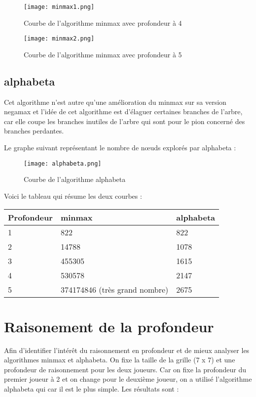 \documentclass[11pt, pdflatex]{report}
\begin{document}
\begin{figure}[H]
    \centering
    \texttt{[image: minmax1.png]}
    \caption{Courbe de l'algorithme minmax avec profondeur à 4}
\end{figure}

\begin{figure}[H]
    \centering
    \texttt{[image: minmax2.png]}
    \caption{Courbe de l'algorithme minmax avec profondeur à 5}
\end{figure}

\newpage
\subsection{alphabeta}
Cet algorithme n’est autre qu’une amélioration du minmax sur sa version negamax et l’idée de cet algorithme est d’élaguer certaines branches de l’arbre, car elle coupe les branches inutiles de l’arbre qui sont pour le pion concerné des branches perdantes.\par
Le graphe suivant représentant le nombre de nœuds explorés par alphabeta :\par

\begin{figure}[H]
    \centering
    \texttt{[image: alphabeta.png]}
    \caption{Courbe de l'algorithme alphabeta}
\end{figure}

Voici le tableau qui résume les deux courbes :
 
 \begin{center}
    \begin{tabular}{|l|l|l|}\hline   
    Profondeur&      minmax&      alphabeta      \\\hline
    1&      822&      822      \\\hline
    2&      14788&      1078      \\\hline
    3&      455305&      1615      \\\hline
    4&      530578&      2147      \\\hline
    5&      374174846 (très grand nombre)&      2675      \\\hline
    \end{tabular}
\end{center}

\newpage
\section{Raisonement de la profondeur}
Afin d’identifier l’intérêt du raisonnement en profondeur et de mieux analyser les algorithmes minmax et alphabeta. On fixe la taille de la grille (7 x 7)  et une profondeur de raisonnement pour les deux joueurs. Car on fixe la profondeur du premier joueur à 2 et on change pour le deuxième joueur, on a utilisé l’algorithme alphabeta qui car il est le plus simple. Les résultats sont :  \par
\end{document}
